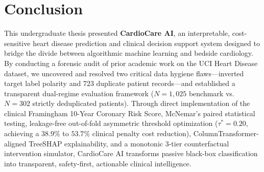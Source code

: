 \documentclass[12pt,a4paper]{report}
\begin{document}
\chapter[Conclusion]{Conclusion}

This undergraduate thesis presented \textbf{CardioCare AI}, an interpretable, cost-sensitive heart disease prediction and clinical decision support system designed to bridge the divide between algorithmic machine learning and bedside cardiology. By conducting a forensic audit of prior academic work on the UCI Heart Disease dataset, we uncovered and resolved two critical data hygiene flaws---inverted target label polarity and 723 duplicate patient records---and established a transparent dual-regime evaluation framework ($N=1,025$ benchmark vs.\ $N=302$ strictly deduplicated patients). Through direct implementation of the clinical Framingham 10-Year Coronary Risk Score, McNemar's paired statistical testing, leakage-free out-of-fold asymmetric threshold optimization ($\tau^* = 0.20$, achieving a $38.9\%$ to $53.7\%$ clinical penalty cost reduction), ColumnTransformer-aligned TreeSHAP explainability, and a monotonic 3-tier counterfactual intervention simulator, CardioCare AI transforms passive black-box classification into transparent, safety-first, actionable clinical intelligence.
\end{document}
